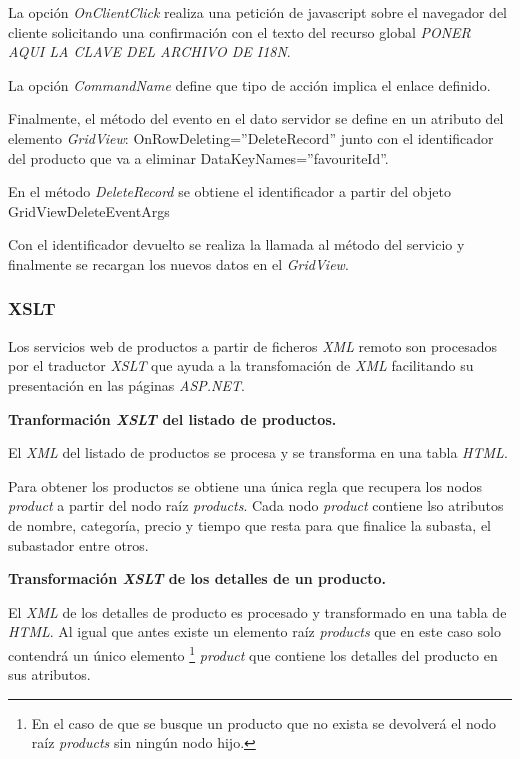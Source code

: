 \documentclass{article}
\begin{document}
	La opción \emph{OnClientClick} realiza una petición de javascript sobre el navegador del cliente solicitando una confirmación con el texto del recurso global \emph{PONER AQUI LA CLAVE DEL ARCHIVO DE I18N}.
	
	La opción \emph{CommandName} define que tipo de acción implica el enlace definido.
	
	Finalmente, el método del evento en el dato servidor se define en un atributo del elemento \emph{GridView}:  {\color{red} OnRowDeleting}{\color{blue}=''DeleteRecord''} junto con el identificador del producto que va a eliminar {\color{red} DataKeyNames}{\color{blue}=''favouriteId''}.
	
	En el método \emph{DeleteRecord} se obtiene el identificador a partir del objeto {\color{BlueGreen} GridViewDeleteEventArgs}
	
	Con el identificador devuelto se realiza la llamada al método del servicio y finalmente se recargan los nuevos datos en el \emph{GridView}.
	
\subsubsection{XSLT}
	Los servicios web de productos a partir de ficheros \emph{XML} remoto son procesados por el traductor \emph{XSLT} que ayuda a la transfomación de \emph{XML} facilitando su presentación en las páginas \emph{ASP.NET}.
	
\textbf{Tranformación \textit{XSLT} del listado de productos.}
	
	El \emph{XML} del listado de productos se procesa y se transforma en una tabla \emph{HTML}.
	
	Para obtener los productos se obtiene una única regla que recupera los nodos \emph{product} a partir del nodo raíz \emph{products}. Cada nodo \emph{product} contiene lso atributos de nombre, categoría, precio y tiempo que resta para que finalice la subasta, el subastador entre otros.
	
	
\textbf{Transformación \textit{XSLT} de los detalles de un producto.}

	El \emph{XML} de los detalles de producto es procesado y transformado en una tabla de \emph{HTML}. Al igual que antes existe un elemento raíz \emph{products} que en este caso solo contendrá un único elemento
\footnote{En el caso de que se busque un producto que no exista se devolverá el nodo raíz \emph{products} sin ningún nodo hijo.}	
\emph{product} que contiene los detalles del producto en sus atributos.
\end{document}
